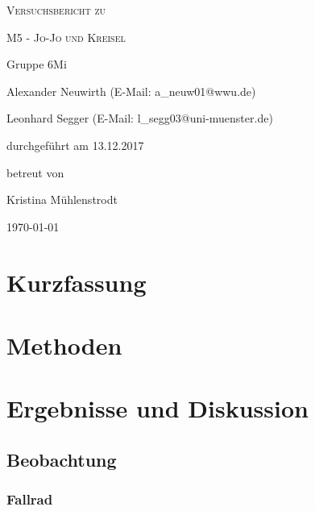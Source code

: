 \documentclass[
	a4paper,
	12pt,
	pagesize,
	ngerman
]{scrartcl}
\begin{document}
	
	\begin{titlepage}
		\centering
		{\scshape\LARGE Versuchsbericht zu \par}
		\vspace{1cm}
		{\scshape\huge M5 - Jo-Jo und Kreisel\par}
		\vspace{2.5cm}
		{\LARGE Gruppe 6Mi \par}
		\vspace{0.5cm}
		
		{\large Alexander Neuwirth (E-Mail: a\_neuw01@wwu.de) \par}
		{\large Leonhard Segger (E-Mail: l\_segg03@uni-muenster.de) \par}
		\vfill
		
		durchgeführt am 13.12.2017\par
		betreut von\par
		{\large Kristina Mühlenstrodt} %
		
		\vfill
		
		{\large \today\par}
	\end{titlepage}
	\tableofcontents
	\newpage


	\section{Kurzfassung}
	
	\section{Methoden}
	
	\section{Ergebnisse und Diskussion}
	

	\subsection{Beobachtung}
	\subsubsection{Fallrad}
\end{document}
